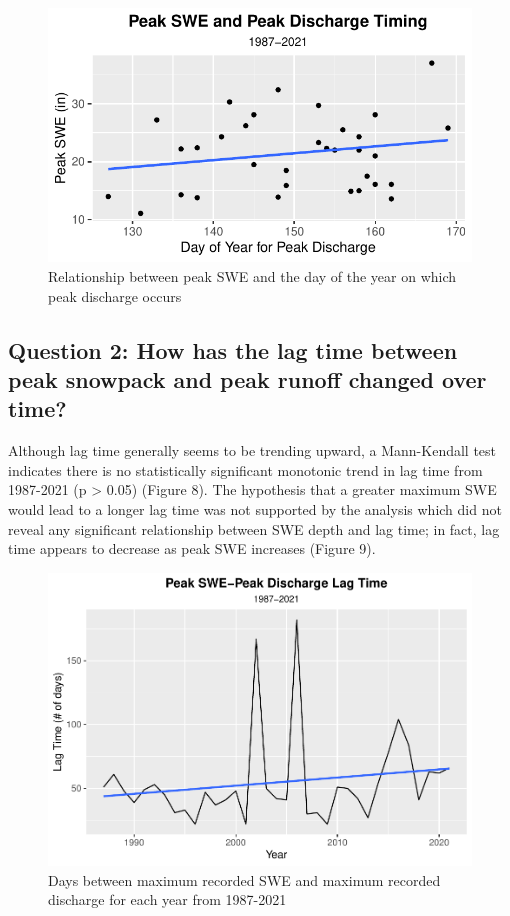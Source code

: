 \documentclass[
  12pt,
]{article}
\begin{document}
\begin{figure}
\centering
\includegraphics{Final_Report_files/figure-latex/unnamed-chunk-6-1.pdf}
\caption{Relationship between peak SWE and the day of the year on which
peak discharge occurs}
\end{figure}

\newpage

\hypertarget{question-2-how-has-the-lag-time-between-peak-snowpack-and-peak-runoff-changed-over-time}{%
\subsection{Question 2: How has the lag time between peak snowpack and
peak runoff changed over
time?}\label{question-2-how-has-the-lag-time-between-peak-snowpack-and-peak-runoff-changed-over-time}}

Although lag time generally seems to be trending upward, a Mann-Kendall
test indicates there is no statistically significant monotonic trend in
lag time from 1987-2021 (p \textgreater{} 0.05) (Figure 8). The
hypothesis that a greater maximum SWE would lead to a longer lag time
was not supported by the analysis which did not reveal any significant
relationship between SWE depth and lag time; in fact, lag time appears
to decrease as peak SWE increases (Figure 9).

\begin{figure}
\centering
\includegraphics{Final_Report_files/figure-latex/unnamed-chunk-7-1.pdf}
\caption{Days between maximum recorded SWE and maximum recorded
discharge for each year from 1987-2021}
\end{figure}
\end{document}
